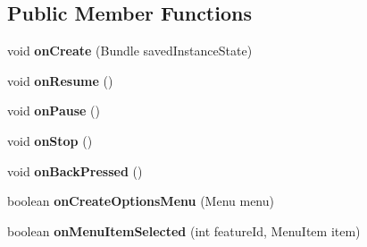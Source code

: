 \subsection*{Public Member Functions}
\begin{DoxyCompactItemize}
\item 
\hypertarget{classcom_1_1mobii_1_1_mobii_settings_activity_ad7d0e69ced5b236b583f78fa9a1cd5f2}{void {\bfseries on\-Create} (Bundle saved\-Instance\-State)}\label{classcom_1_1mobii_1_1_mobii_settings_activity_ad7d0e69ced5b236b583f78fa9a1cd5f2}

\item 
\hypertarget{classcom_1_1mobii_1_1_mobii_settings_activity_a430e30c18f7434d1da27dc220b0a8e32}{void {\bfseries on\-Resume} ()}\label{classcom_1_1mobii_1_1_mobii_settings_activity_a430e30c18f7434d1da27dc220b0a8e32}

\item 
\hypertarget{classcom_1_1mobii_1_1_mobii_settings_activity_a96b94d13fbfba40de082da23cd82e5c8}{void {\bfseries on\-Pause} ()}\label{classcom_1_1mobii_1_1_mobii_settings_activity_a96b94d13fbfba40de082da23cd82e5c8}

\item 
\hypertarget{classcom_1_1mobii_1_1_mobii_settings_activity_a7d2f912b0fa857ed680fa32248756e3e}{void {\bfseries on\-Stop} ()}\label{classcom_1_1mobii_1_1_mobii_settings_activity_a7d2f912b0fa857ed680fa32248756e3e}

\item 
\hypertarget{classcom_1_1mobii_1_1_mobii_settings_activity_a7660dd5d32e7fd8b53d908351da9660e}{void {\bfseries on\-Back\-Pressed} ()}\label{classcom_1_1mobii_1_1_mobii_settings_activity_a7660dd5d32e7fd8b53d908351da9660e}

\item 
\hypertarget{classcom_1_1mobii_1_1_mobii_settings_activity_a098b800b0b0049d6de23bc009aeb0ef7}{boolean {\bfseries on\-Create\-Options\-Menu} (Menu menu)}\label{classcom_1_1mobii_1_1_mobii_settings_activity_a098b800b0b0049d6de23bc009aeb0ef7}

\item 
\hypertarget{classcom_1_1mobii_1_1_mobii_settings_activity_a07c0ec5d93ae294919d8d90c06028c9f}{boolean {\bfseries on\-Menu\-Item\-Selected} (int feature\-Id, Menu\-Item item)}\label{classcom_1_1mobii_1_1_mobii_settings_activity_a07c0ec5d93ae294919d8d90c06028c9f}

\end{DoxyCompactItemize}
